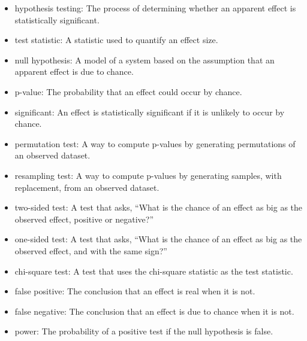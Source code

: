 \documentclass[12pt]{book}
\begin{document}
\begin{itemize}

\item hypothesis testing: The process of determining whether an apparent
effect is statistically significant.

\item test statistic: A statistic used to quantify an effect size.

\item null hypothesis: A model of a system based on the assumption that
an apparent effect is due to chance.

\item p-value: The probability that an effect could occur by chance.

\item significant: An effect is statistically significant if it is unlikely
to occur by chance.

\item permutation test: A way to compute p-values by generating
  permutations of an observed dataset.

\item resampling test: A way to compute p-values by generating
  samples, with replacement, from an observed dataset.

\item two-sided test: A test that asks, ``What is the chance of an effect
as big as the observed effect, positive or negative?''

\item one-sided test: A test that asks, ``What is the chance of an effect
as big as the observed effect, and with the same sign?''

\item chi-square test: A test that uses the chi-square statistic as
the test statistic.

\item false positive: The conclusion that an effect is real when it is not.

\item false negative: The conclusion that an effect is due to chance when it
is not.

\item power: The probability of a positive test if the null hypothesis
is false.

\end{itemize}
\end{document}
